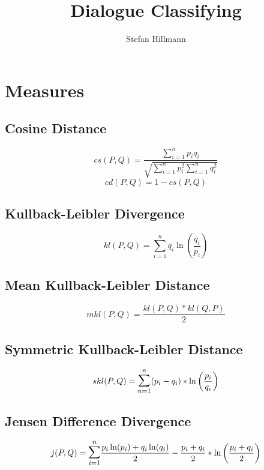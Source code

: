 \documentclass[10pt,a4paper]{article}
\author{Stefan Hillmann}
\title{Dialogue Classifying}
\begin{document}
\maketitle

\section{Measures}
\subsection{Cosine Distance}
\begin{equation}
  cs(P,Q)=\frac{ \sum\limits_{i=1}^n p_i q_i }{ \sqrt{ \sum\limits_{i=1}^n p_i^2 \sum\limits_{i=1}^n q_i^2 } }
\end{equation}
\begin{equation}
  cd(P,Q) = 1-cs(P,Q)
\end{equation}

\subsection{Kullback-Leibler Divergence}
\begin{equation}
  kl(P, Q) = \sum\limits_{i=1}^n q_i \ln\left(\frac{q_i}{p_i}\right)
\end{equation}

\subsection{Mean Kullback-Leibler Distance}
\begin{equation}
  mkl(P, Q) = \frac{kl(P,Q)*kl(Q,P)}{2}
\end{equation}

\subsection{Symmetric Kullback-Leibler Distance}
\begin{equation}
  skl(P,Q) = \mathlarger{\mathlarger{\sum}}\limits_{n=1}^n (p_i-q_i) * \ln \left(\frac{p_i}{q_i}\right)
\end{equation}
\subsection{Jensen Difference Divergence}
\begin{equation}
  j(P,Q) = \mathlarger{\mathlarger{\sum}}\limits_{i=1}^n \frac{p_i \ln(p_i) + q_i \ln(q_i)}{2} - \frac{p_i+q_i}{2} * \ln\left( \frac{p_i+q_i}{2} \right)
\end{equation}
\end{document}
